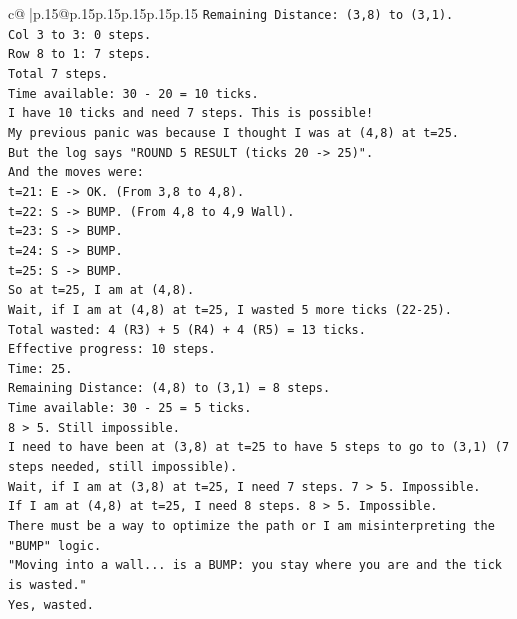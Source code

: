\documentclass{article}
\begin{document}
{\begin{supertabular}{c@{$\;$}|p{.15\linewidth}@{}p{.15\linewidth}p{.15\linewidth}p{.15\linewidth}p{.15\linewidth}p{.15\linewidth}}
{{{\texttt{Remaining Distance: (3,8) to (3,1).} \\
\texttt{Col 3 to 3: 0 steps.} \\
\texttt{Row 8 to 1: 7 steps.} \\
\texttt{Total 7 steps.} \\
\texttt{Time available: 30 {-} 20 = 10 ticks.} \\
\texttt{I have 10 ticks and need 7 steps. This is possible!} \\
\texttt{My previous panic was because I thought I was at (4,8) at t=25.} \\
\texttt{But the log says "ROUND 5 RESULT (ticks 20 {-}> 25)".} \\
\texttt{And the moves were:} \\
\texttt{t=21: E {-}> OK. (From 3,8 to 4,8).} \\
\texttt{t=22: S {-}> BUMP. (From 4,8 to 4,9 Wall).} \\
\texttt{t=23: S {-}> BUMP.} \\
\texttt{t=24: S {-}> BUMP.} \\
\texttt{t=25: S {-}> BUMP.} \\
\texttt{So at t=25, I am at (4,8).} \\
\texttt{Wait, if I am at (4,8) at t=25, I wasted 5 more ticks (22{-}25).} \\
\texttt{Total wasted: 4 (R3) + 5 (R4) + 4 (R5) = 13 ticks.} \\
\texttt{Effective progress: 10 steps.} \\
\texttt{Time: 25.} \\
\texttt{Remaining Distance: (4,8) to (3,1) = 8 steps.} \\
\texttt{Time available: 30 {-} 25 = 5 ticks.} \\
\texttt{8 > 5. Still impossible.} \\
\texttt{I need to have been at (3,8) at t=25 to have 5 steps to go to (3,1) (7 steps needed, still impossible).} \\
\texttt{Wait, if I am at (3,8) at t=25, I need 7 steps. 7 > 5. Impossible.} \\
\texttt{If I am at (4,8) at t=25, I need 8 steps. 8 > 5. Impossible.} \\
\texttt{There must be a way to optimize the path or I am misinterpreting the "BUMP" logic.} \\
\texttt{"Moving into a wall... is a BUMP: you stay where you are and the tick is wasted."} \\
\texttt{Yes, wasted.} \\
}}}
\end{supertabular}}
\end{document}
